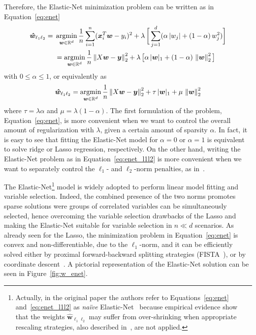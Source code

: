			Therefore, the Elastic-Net minimization problem can be written as in Equation~\eqref{eq:enet}
			\begin{equation} \label{eq:enet}
				\begin{aligned}
				\bm{\hat w}_{\ell_1\ell_2} = {} & \mathop{\mathrm{argmin}}\limits_{\bm{w} \in \mathbb{R}^d} \frac{1}{n} \sum_{i=1}^n (\bm{x}_i^T\bm{w} - y_i)^2 + \lambda\,\bigg[ \sum_{j=1}^d (\alpha\,|w_j| + (1-\alpha)\,w_j^2) \bigg] \\
				& = \mathop{\mathrm{argmin}}\limits_{\bm{w} \in \mathbb{R}^d} \frac{1}{n} \left\lVert X\bm{w} - \bm{y}\right\rVert_2^2 + \lambda\,\big[ \alpha\,|\bm{w}|_1 + (1-\alpha)\,\left\lVert\bm{w}\right\rVert_2^2 \big]
			\end{aligned}
		  \end{equation}
			with $0 \leq \alpha \leq 1$, or equivalently as
			\begin{equation} \label{eq:enet_l1l2}
			\bm{\hat w}_{\ell_1\ell_2} = \mathop{\mathrm{argmin}}\limits_{\bm{w} \in \mathbb{R}^d} \frac{1}{n} \left\lVert X\bm{w} - \bm{y}\right\rVert_2^2 + \tau\,|\bm{w}|_1 + \mu\,\left\lVert\bm{w}\right\rVert_2^2
			\end{equation}
			where $\tau = \lambda\alpha$ and $\mu = \lambda(1-\alpha)$. The first formulation of the problem, Equation~\eqref{eq:enet}, is more convenient when we want to control the overall amount of regularization with $\lambda$, given a certain amount of sparsity $\alpha$. In fact, it is easy to see that fitting the Elastic-Net model for $\alpha=0$ or $\alpha=1$ is equivalent to solve ridge or Lasso regression, respectively. On the other hand, writing the Elastic-Net problem as in Equation~\eqref{eq:enet_l1l2} is more convenient when we want to separately control the $\ell_1$- and $\ell_2$-norm penalties, as in~\cite{de2009regularized}.

			The Elastic-Net\footnote{ Actually, in the original paper the authors refer to Equations~\eqref{eq:enet} and~\eqref{eq:enet_l1l2} as \textit{na\"ive} Elastic-Net~\cite{zou2005regularization} because empirical evidence show that the weights $\bm{\hat w}_{\ell_1\ell_2}$ may suffer from over-shrinking when appropriate rescaling strategies, also described in~\cite{de2009regularized},  are not applied.} model is widely adopted to perform linear model fitting and variable selection. Indeed, the combined presence of the two norms promotes sparse solutions were groups of correlated variables can be simultaneously selected, hence overcoming the variable selection drawbacks of the Lasso and making the Elastic-Net suitable for variable selection in $n \ll d$ scenarios.
			As already seen for the Lasso, the minimization problem in Equation~\eqref{eq:enet} is convex and non-differentiable, due to the $\ell_1$-norm, and it can be efficiently solved either by proximal forward-backward splitting strategies (\eg FISTA~\cite{beck2009fast}), or by coordinate descent~\cite{wu2008coordinate}. A pictorial representation of the Elastic-Net solution can be seen in Figure~\ref{fig:w_enet}.

